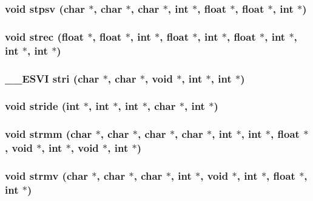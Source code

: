 \subsubsection{\setlength{\rightskip}{0pt plus 5cm}void stpsv (char $\ast$, char $\ast$, char $\ast$, int $\ast$, float $\ast$, float $\ast$, int $\ast$)}\label{essl_8h_e6edb3d9ffae5fb4c3a1e2eeeef1d154}


\subsubsection{\setlength{\rightskip}{0pt plus 5cm}void strec (float $\ast$, float $\ast$, int $\ast$, float $\ast$, int $\ast$, float $\ast$, int $\ast$, int $\ast$, int $\ast$)}\label{essl_8h_98be86c66c71086556bdfa2885bef3ec}


\subsubsection{\setlength{\rightskip}{0pt plus 5cm}\_\-\_\-ESVI stri (char $\ast$, char $\ast$, void $\ast$, int $\ast$, int $\ast$)}\label{essl_8h_7628560d82a8914bf1bb86ba7d4f824d}


\subsubsection{\setlength{\rightskip}{0pt plus 5cm}void stride (int $\ast$, int $\ast$, int $\ast$, char $\ast$, int $\ast$)}\label{essl_8h_903b6f9e104fe2e74cc5bdf550fcbd8e}


\subsubsection{\setlength{\rightskip}{0pt plus 5cm}void strmm (char $\ast$, char $\ast$, char $\ast$, char $\ast$, int $\ast$, int $\ast$, float $\ast$, void $\ast$, int $\ast$, void $\ast$, int $\ast$)}\label{essl_8h_387eaf471f2000a2cb8d324b44556361}


\subsubsection{\setlength{\rightskip}{0pt plus 5cm}void strmv (char $\ast$, char $\ast$, char $\ast$, int $\ast$, void $\ast$, int $\ast$, float $\ast$, int $\ast$)}\label{essl_8h_e19fd32da67966bd92f1222ce0748f23}


